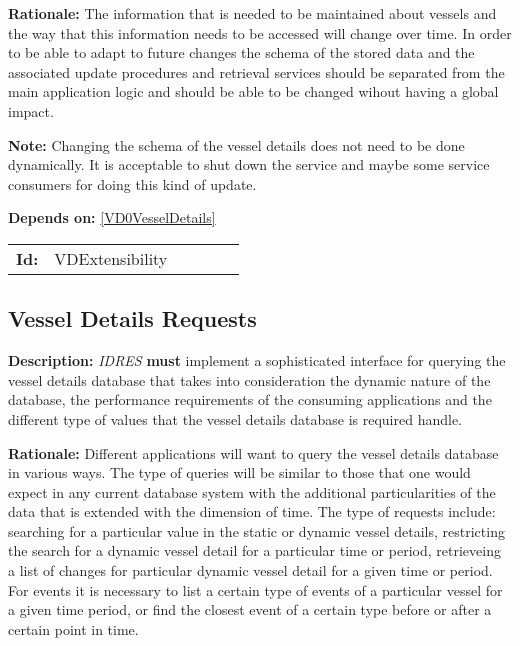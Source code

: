 \textbf{Rationale:} The information that is needed to be maintained about vessels and the way that this information needs to be accessed will change over time. In order to be able to adapt to future changes the schema of the  stored data and the associated update procedures and retrieval services  should be separated from the main application logic and should be able  to be changed wihout having a global impact. 

\textbf{Note:} Changing the schema of the vessel details does not need to be done dynamically. It is acceptable to shut down the service and maybe some service consumers for doing this kind of update. 

\textbf{Depends on:} \ref{VD0VesselDetails} 

\par
{\small \begin{center}\begin{tabular}{rlrlrl}
\textbf{Id:} & VDExtensibility  & & & \end{tabular}\end{center} }

\subsection{Vessel Details Requests}\label{VDRequest}
\textbf{Description:} \textsl{IDRES} \textbf{must} implement a sophisticated interface for querying the vessel details database that takes into consideration the dynamic nature of the database, the performance requirements of the  consuming applications and the different type of values that the vessel details database is required handle.

\textbf{Rationale:} Different applications will want to query the vessel details  database in various ways. The type of queries will be similar to those  that one would expect in any current database system with the additional particularities of the data that is extended with the dimension of time.  The type of requests include: searching for a particular value in the static or dynamic vessel details, restricting the search for a dynamic  vessel detail for a particular time or period, retrieveing a list of changes for particular dynamic vessel detail for a given time or period. For events it is necessary to list a certain type of events of a particular vessel for a given time period, or find the closest event of a certain type before or after a certain point in time. 

